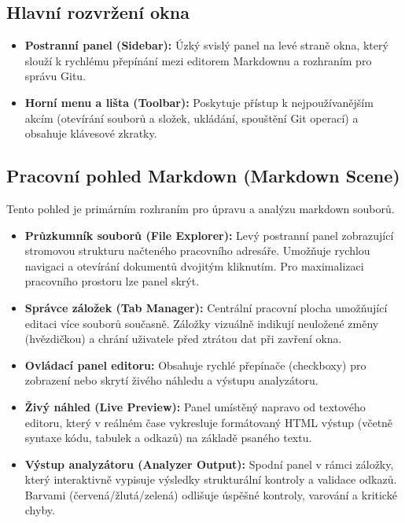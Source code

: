 \documentclass[12pt, a4paper]{article}
\begin{document}
\subsection{Hlavní rozvržení okna}
\begin{itemize}
    \item \textbf{Postranní panel (Sidebar):} Úzký svislý panel na levé straně okna, který slouží k rychlému přepínání mezi editorem Markdownu a rozhraním pro správu Gitu.
    \item \textbf{Horní menu a lišta (Toolbar):} Poskytuje přístup k nejpoužívanějším akcím (otevírání souborů a složek, ukládání, spouštění Git operací) a obsahuje klávesové zkratky.
\end{itemize}

\subsection{Pracovní pohled Markdown (Markdown Scene)}
Tento pohled je primárním rozhraním pro úpravu a analýzu markdown souborů.
\begin{itemize}
    \item \textbf{Průzkumník souborů (File Explorer):} Levý postranní panel zobrazující stromovou strukturu načteného pracovního adresáře. Umožňuje rychlou navigaci a otevírání dokumentů dvojitým kliknutím. Pro maximalizaci pracovního prostoru lze panel skrýt.
    \item \textbf{Správce záložek (Tab Manager):} Centrální pracovní plocha umožňující editaci více souborů současně. Záložky vizuálně indikují neuložené změny (hvězdičkou) a chrání uživatele před ztrátou dat při zavření okna.
    \item \textbf{Ovládací panel editoru:} Obsahuje rychlé přepínače (checkboxy) pro zobrazení nebo skrytí živého náhledu a výstupu analyzátoru.
    \item \textbf{Živý náhled (Live Preview):} Panel umístěný napravo od textového editoru, který v reálném čase vykresluje formátovaný HTML výstup (včetně syntaxe kódu, tabulek a odkazů) na základě psaného textu.
    \item \textbf{Výstup analyzátoru (Analyzer Output):} Spodní panel v rámci záložky, který interaktivně vypisuje výsledky strukturální kontroly a validace odkazů. Barvami (červená/žlutá/zelená) odlišuje úspěšné kontroly, varování a kritické chyby.
\end{itemize}
\end{document}
